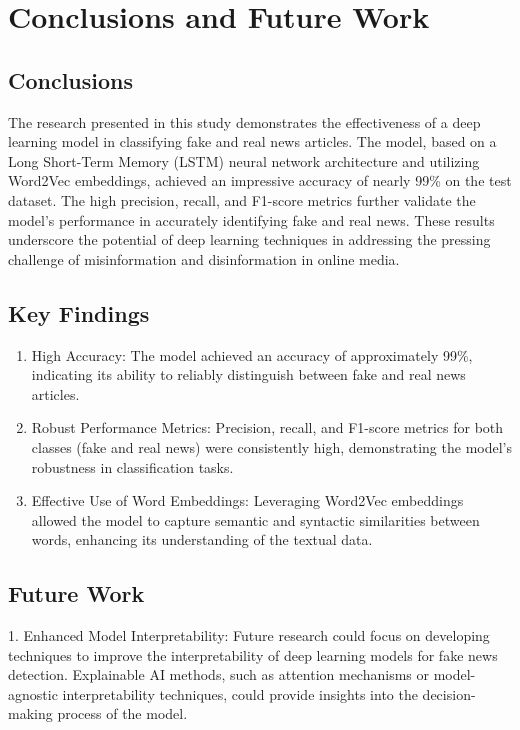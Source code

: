 \chapter{Conclusions and Future Work}
\label{ch:con}

\section{Conclusions}

The research presented in this study demonstrates the effectiveness of a deep learning model in classifying fake and real news articles. The model, based on a Long Short-Term Memory (LSTM) neural network architecture and utilizing Word2Vec embeddings, achieved an impressive accuracy of nearly 99\% on the test dataset. The high precision, recall, and F1-score metrics further validate the model's performance in accurately identifying fake and real news. These results underscore the potential of deep learning techniques in addressing the pressing challenge of misinformation and disinformation in online media.

\section{Key Findings}

\begin{enumerate}
    \item High Accuracy: The model achieved an accuracy of approximately 99\%, indicating its ability to reliably distinguish between fake and real news articles.
    \item Robust Performance Metrics: Precision, recall, and F1-score metrics for both classes (fake and real news) were consistently high, demonstrating the model's robustness in classification tasks.
    \item Effective Use of Word Embeddings: Leveraging Word2Vec embeddings allowed the model to capture semantic and syntactic similarities between words, enhancing its understanding of the textual data.
\end{enumerate}

\section{Future Work}

1. Enhanced Model Interpretability: Future research could focus on developing techniques to improve the interpretability of deep learning models for fake news detection. Explainable AI methods, such as attention mechanisms or model-agnostic interpretability techniques, could provide insights into the decision-making process of the model.

